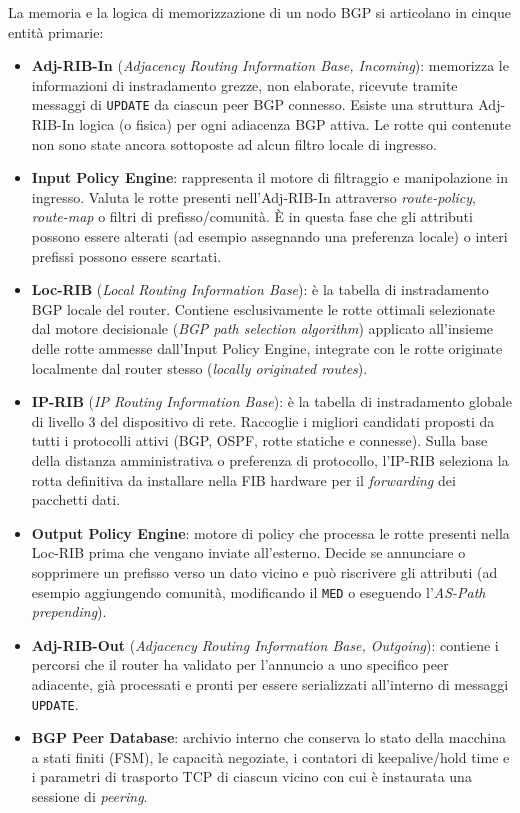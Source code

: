 \documentclass[11pt, a4paper]{article}
\begin{document}
La memoria e la logica di memorizzazione di un nodo BGP si articolano in cinque entità primarie:
\begin{itemize}[noitemsep]
    \item \textbf{Adj-RIB-In} (\emph{Adjacency Routing Information Base, Incoming}): memorizza le informazioni di instradamento grezze, non elaborate, ricevute tramite messaggi di \texttt{UPDATE} da ciascun peer BGP connesso. Esiste una struttura Adj-RIB-In logica (o fisica) per ogni adiacenza BGP attiva. Le rotte qui contenute non sono state ancora sottoposte ad alcun filtro locale di ingresso.
    \item \textbf{Input Policy Engine}: rappresenta il motore di filtraggio e manipolazione in ingresso. Valuta le rotte presenti nell'Adj-RIB-In attraverso \emph{route-policy}, \emph{route-map} o filtri di prefisso/comunità. È in questa fase che gli attributi possono essere alterati (ad esempio assegnando una preferenza locale) o interi prefissi possono essere scartati.
    \item \textbf{Loc-RIB} (\emph{Local Routing Information Base}): è la tabella di instradamento BGP locale del router. Contiene esclusivamente le rotte ottimali selezionate dal motore decisionale (\emph{BGP path selection algorithm}) applicato all'insieme delle rotte ammesse dall'Input Policy Engine, integrate con le rotte originate localmente dal router stesso (\emph{locally originated routes}).
    \item \textbf{IP-RIB} (\emph{IP Routing Information Base}): è la tabella di instradamento globale di livello 3 del dispositivo di rete. Raccoglie i migliori candidati proposti da tutti i protocolli attivi (BGP, OSPF, rotte statiche e connesse). Sulla base della distanza amministrativa o preferenza di protocollo, l'IP-RIB seleziona la rotta definitiva da installare nella FIB hardware per il \emph{forwarding} dei pacchetti dati.
    \item \textbf{Output Policy Engine}: motore di policy che processa le rotte presenti nella Loc-RIB prima che vengano inviate all'esterno. Decide se annunciare o sopprimere un prefisso verso un dato vicino e può riscrivere gli attributi (ad esempio aggiungendo comunità, modificando il \texttt{MED} o eseguendo l'\emph{AS-Path prepending}).
    \item \textbf{Adj-RIB-Out} (\emph{Adjacency Routing Information Base, Outgoing}): contiene i percorsi che il router ha validato per l'annuncio a uno specifico peer adiacente, già processati e pronti per essere serializzati all'interno di messaggi \texttt{UPDATE}.
    \item \textbf{BGP Peer Database}: archivio interno che conserva lo stato della macchina a stati finiti (FSM), le capacità negoziate, i contatori di keepalive/hold time e i parametri di trasporto TCP di ciascun vicino con cui è instaurata una sessione di \emph{peering}.
\end{itemize}
\end{document}
